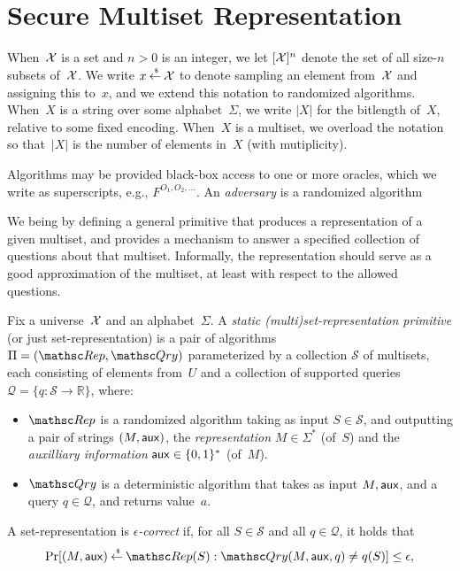\section{Secure Multiset Representation}
\def\pub{{\sf pub}}
\def\aux{{\sf aux}}

When~${\cal X}$ is a set and $n>0$ is an integer, we let $[{\cal X}]^n$ denote the set of all size-$n$ subsets of~${\cal X}$. We write $x {\:\stackrel{{\scriptscriptstyle \hspace{0.2em}\$}} {\leftarrow}\:} {\cal X}$ to denote sampling an element from~${\cal X}$ and assigning this to~$x$, and we extend this notation to randomized algorithms.  When~$X$ is a string over some alphabet~$\Sigma$, we write $|X|$ for the bitlength of~$X$, relative to some fixed encoding.  When~$X$ is a multiset, we overload the notation so that~$|X|$ is the number of elements in~$X$ (with mutiplicity).

Algorithms may be provided black-box access to one or more oracles, which we write as superscripts, e.g., $F^{O_1,O_2,\ldots}$.  An \emph{adversary} is a randomized algorithm

  We being by defining a general primitive that produces a representation of a given multiset, and provides a mechanism to answer a specified collection of questions about that multiset.  Informally, the representation should serve as a good approximation of the multiset, at least with respect to the allowed questions.
\begin{definition} 
Fix a universe~${\cal X}$ and an alphabet~$\Sigma$.  A \emph{static (multi)set-representation primitive} (or just set-representation) is a pair of algorithms $\setprim=(\Rep, \Qry)$
parameterized by a collection $\mathcal{S}$ of multisets, each consisting of elements from~$U$ and a collection
of supported queries $\mathcal{Q}=\{q \colon \mathcal{S} \to \mathbb{R}\}$, where:
\begin{itemize}
\item $\Rep$ is a randomized algorithm taking as input $S \in \mathcal{S}$,
and outputting a pair of strings $(M,\aux)$, the \emph{representation} $M \in \Sigma^*$ (of~$S$) 
and the \emph{auxilliary information} $\aux \in \bits^*$ (of~$M$).
\item $\Qry$ is a deterministic algorithm that takes as input $M, \aux$,
and a query $q\in \mathcal{Q}$, and returns value~$a$.
\end{itemize}
A set-representation is \emph{$\epsilon$-correct} if, for all $S \in \mathcal{S}$ and
all $q \in \mathcal{Q}$, it holds that
\begin{eqnarray}
\Pr[(M,\aux) \getsr \Rep(S) : \Qry(M, \aux, q) \neq q(S)] \leq \epsilon, \label{eqn:correctness}
\end{eqnarray}
\end{definition}

